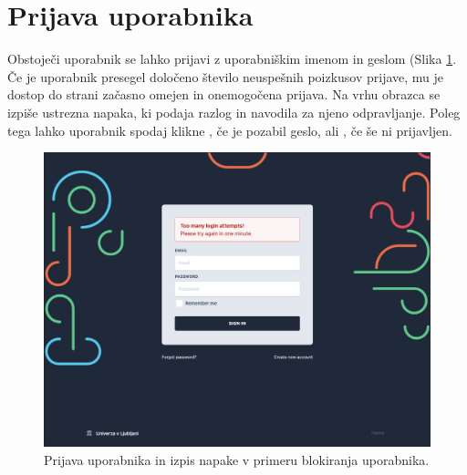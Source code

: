 \documentclass[a4paper, 12pt]{book}
\begin{document}
\newpage
\section{Prijava uporabnika }
\label{sign-in-page}
Obstoječi uporabnik se lahko prijavi z uporabniškim imenom in geslom (Slika \ref{login-form}. Če je uporabnik presegel določeno število neuspešnih poizkusov prijave, mu je dostop do strani začasno omejen in onemogočena prijava. Na vrhu obrazca se izpiše ustrezna napaka, ki podaja razlog in navodila za njeno odpravljanje. Poleg tega lahko uporabnik spodaj klikne , če je pozabil geslo, ali , če še ni prijavljen. 



\begin{figure}[h]
\begin{center}
\includegraphics[width=1\textwidth]{slike/signin-throttling.png}
\end{center}
\caption{ Prijava uporabnika in izpis napake v primeru blokiranja uporabnika. }
\label{login-form}
\end{figure}

\end{document}
